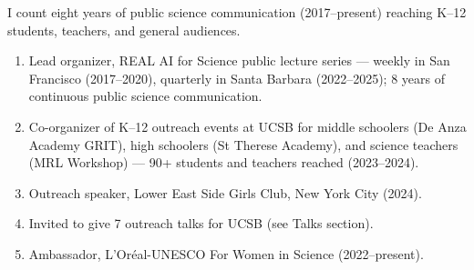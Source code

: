 I count eight years of public science communication (2017--present) reaching K--12 students, teachers, and general audiences.

\begin{enumerate}[leftmargin=*,itemsep=0.1em,topsep=0.15em,parsep=0pt,partopsep=0pt]
    \item Lead organizer, REAL AI for Science public lecture series --- weekly in San Francisco (2017--2020), quarterly in Santa Barbara (2022--2025); 8 years of continuous public science communication.
    \item Co-organizer of K--12 outreach events at UCSB for middle schoolers (De Anza Academy GRIT), high schoolers (St Therese Academy), and science teachers (MRL Workshop) --- 90+ students and teachers reached (2023--2024).
    \item Outreach speaker, Lower East Side Girls Club, New York City (2024).
    \item Invited to give 7 outreach talks for UCSB (see Talks section).
    \item Ambassador, L'Or\'eal-UNESCO For Women in Science (2022--present).
\end{enumerate}